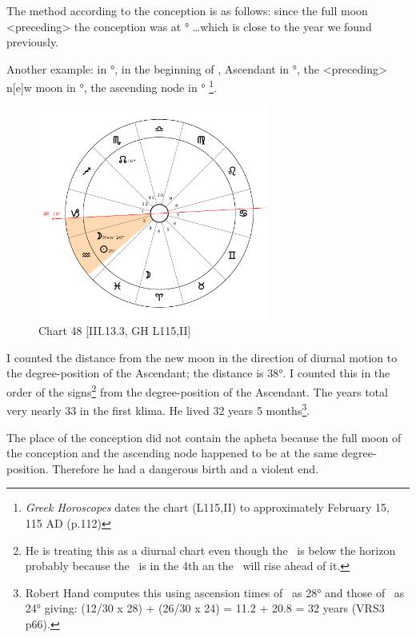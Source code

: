 The method according to the conception is as follows: since the full moon <preceding> the conception was at \Capricorn\xspace 21° \ldots which is close to the year we found previously.

\newpage
Another example: \Sun\xspace in \Aquarius\xspace 29°, \Moon\xspace in the beginning of \Aries, Ascendant in \Capricorn\xspace 18°,
the <preceding> n[e]w moon in \Aquarius\xspace 26°, the ascending node in \Scorpio\xspace 16°
\footnote{\textit{Greek Horoscopes} dates the chart (L115,II) to approximately February 15, 115 AD (p.112)}.

\clearpage
\begin{figure}
\centering
\vspace{-20pt}
\includegraphics[width=0.68\textwidth]{charts/3_13_3}
\caption{Chart 48 [III.13.3, GH L115,II]}
\label{fig:chart48}
\end{figure}

I counted the distance from the new moon in the direction of diurnal motion to the degree-position of the Ascendant; the distance is 38°. I counted this in the order of the signs\footnote{He is treating this as a diurnal chart even though the \Sun\, is below the horizon probably because the \Moon\, is in the 4th an the \Sun\, will rise ahead of it.} from the degree-position of the Ascendant. The years total very nearly 33 in the first klima. He lived 32 years 5 months\footnote{Robert Hand computes this using ascension times of \Capricorn\, as 28° and those of \Aquarius\, as 24° giving: (12/30 x 28) + (26/30 x 24) = 11.2 + 20.8 = 32 years (VRS3 p66).}. 

The place of the conception did not contain the apheta because the full moon of the conception and the ascending node happened to be at the same degree-position. Therefore he had a dangerous birth and a violent end.

\newpage